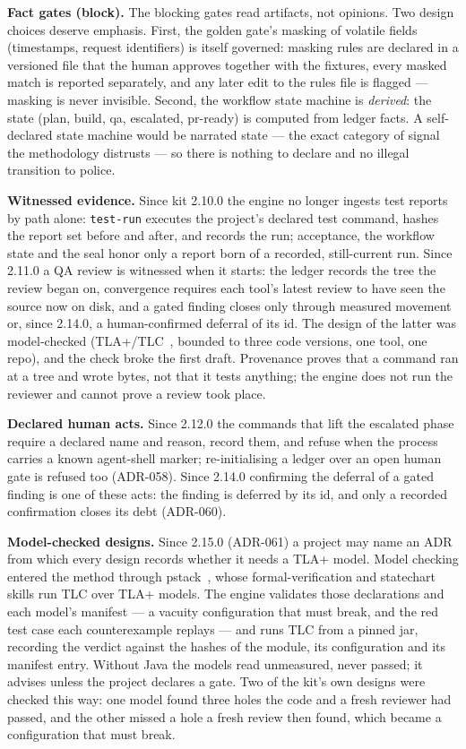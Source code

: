 \documentclass[11pt]{article}
\begin{document}
\textbf{Fact gates (block).} The blocking gates read artifacts, not opinions.
Two design choices deserve emphasis. First, the golden gate's masking of
volatile fields (timestamps, request identifiers) is itself governed: masking
rules are declared in a versioned file that the human approves together with
the fixtures, every masked match is reported separately, and any later edit to
the rules file is flagged --- masking is never invisible. Second, the workflow
state machine is \emph{derived}: the state (plan, build, qa, escalated,
pr-ready) is computed from ledger facts. A self-declared state machine would
be narrated state --- the exact category of signal the methodology distrusts
--- so there is nothing to declare and no illegal transition to police.

\textbf{Witnessed evidence.} Since kit 2.10.0 the engine no longer ingests test
reports by path alone: \texttt{test-run} executes the project's declared test
command, hashes the report set before and after, and records the run;
acceptance, the workflow state and the seal honor only a report born of a
recorded, still-current run. Since 2.11.0 a QA review is witnessed when it
starts: the ledger records the tree the review began on, convergence requires
each tool's latest review to have seen the source now on disk, and a gated
finding closes only through measured movement or, since 2.14.0, a human-confirmed deferral of its id. The design of the latter was
model-checked (TLA+/TLC~\cite{lamport2002specifying,yu1999tlc}, bounded to three code versions, one tool, one repo),
and the check broke the first draft. Provenance proves that a command ran at a
tree and wrote bytes, not that it tests anything; the engine does not run the
reviewer and cannot prove a review took place.

\textbf{Declared human acts.} Since 2.12.0 the commands that lift the escalated
phase require a declared name and reason, record them, and refuse when the
process carries a known agent-shell marker; re-initialising a ledger over an
open human gate is refused too (ADR-058). Since 2.14.0 confirming the deferral of a gated finding is one of these acts: the finding is deferred by its id, and only a recorded confirmation closes its debt (ADR-060).

\textbf{Model-checked designs.} Since 2.15.0 (ADR-061) a project may name an
ADR from which every design records whether it needs a TLA+ model. Model
checking entered the method through pstack~\cite{tan2026pstack}, whose
formal-verification and statechart skills run TLC over TLA+ models. The engine
validates those declarations and each model's manifest --- a vacuity
configuration that must break, and the red test case each counterexample
replays --- and runs TLC from a pinned jar, recording the verdict against the
hashes of the module, its configuration and its manifest entry. Without Java
the models read unmeasured, never passed; it advises unless the project
declares a gate. Two of the kit's own designs were checked this way: one
model found three holes the code and a fresh reviewer had passed, and the
other missed a hole a fresh review then found, which became a configuration
that must break.
\end{document}
